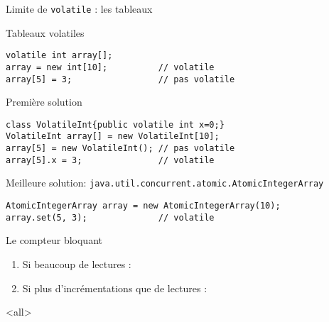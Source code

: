 \begin{frame}[fragile]{Limite de \lstinline{volatile} : les tableaux}
  \begin{exampleblock}{Tableaux volatiles}
    \begin{lstlisting}[numbers=none]
volatile int array[];
array = new int[10];          // volatile
array[5] = 3;                 // pas volatile
    \end{lstlisting}    
  \end{exampleblock}
  \pause
  \begin{alertblock}{Première solution}
    \begin{lstlisting}[numbers=none]
class VolatileInt{public volatile int x=0;}
VolatileInt array[] = new VolatileInt[10];
array[5] = new VolatileInt(); // pas volatile
array[5].x = 3;               // volatile
    \end{lstlisting}
  \end{alertblock}
  \pause
  \begin{block}{Meilleure solution: \lstinline{java.util.concurrent.atomic.AtomicIntegerArray}}
    \begin{lstlisting}[numbers=none]
AtomicIntegerArray array = new AtomicIntegerArray(10);
array.set(5, 3);              // volatile
    \end{lstlisting}
  \end{block}    
\end{frame}


\begin{frame}[fragile]{Le compteur bloquant}
\begin{enumerate}
\item Si beaucoup de lectures :

\item Si plus d'incrémentations que de lectures :

\end{enumerate}
\end{frame}


\mode<all>
